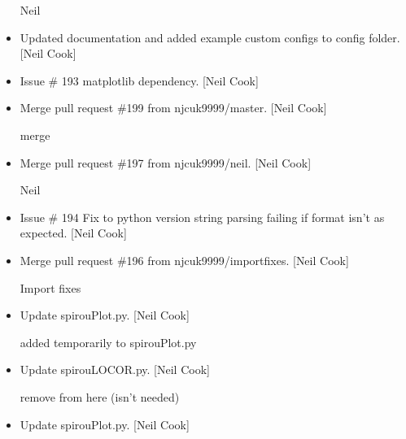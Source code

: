 \documentclass[a4paper,10pt,english]{report}
\begin{document}
\begin{itemize}
Neil

\item {} 
Updated documentation and added example custom configs to config
folder. {[}Neil Cook{]}

\item {} 
Issue \# 193 \sphinxhyphen{} matplotlib dependency. {[}Neil Cook{]}

\item {} 
Merge pull request \#199 from njcuk9999/master. {[}Neil Cook{]}

merge

\item {} 
Merge pull request \#197 from njcuk9999/neil. {[}Neil Cook{]}

Neil

\item {} 
Issue \# 194 \sphinxhyphen{} Fix to python version string parsing failing if format
isn’t as expected. {[}Neil Cook{]}

\item {} 
Merge pull request \#196 from njcuk9999/import\sphinxhyphen{}fixes. {[}Neil Cook{]}

Import fixes

\item {} 
Update spirouPlot.py. {[}Neil Cook{]}

added  temporarily to spirouPlot.py

\item {} 
Update spirouLOCOR.py. {[}Neil Cook{]}

remove  from here (isn’t needed)

\item {} 
Update spirouPlot.py. {[}Neil Cook{]}

\end{itemize}
\end{document}
